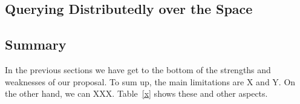 

\subsection{Querying Distributedly over the Space}





\subsection{Summary}

In the previous sections we have get to the bottom of the strengths and weaknesses of our proposal.
To sum up, the main limitations are X and Y.
On the other hand, we can XXX.
Table~\ref{x} shows these and other aspects.

%
%





